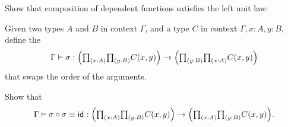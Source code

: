 \begin{exercises}
\begin{subexenum}
\begin{prooftree}
\end{prooftree}
\item Show that composition of dependent functions satisfies the left unit law:
\begin{prooftree}
\end{prooftree}
\end{subexenum}
\item \label{ex:swap}
\begin{subexenum}
\item Given two types $A$ and $B$ in context $\Gamma$, and a type $C$ in context $\Gamma,x:A,y:B$, define the 
\begin{equation*}
\Gamma\vdash \sigma:\Big(\prd{x:A}{y:B}C(x,y)\Big)\to\Big(\prd{y:B}{x:A}C(x,y)\Big)
\end{equation*}
that swaps the order of the arguments.
\item Show that
\begin{equation*}
\Gamma\vdash \sigma\circ\sigma\jdeq\idfunc:\Big(\prd{x:A}{y:B}C(x,y)\Big)\to \Big(\prd{x:A}{y:B}C(x,y)\Big).
\end{equation*}
\end{subexenum}
\end{exercises}
